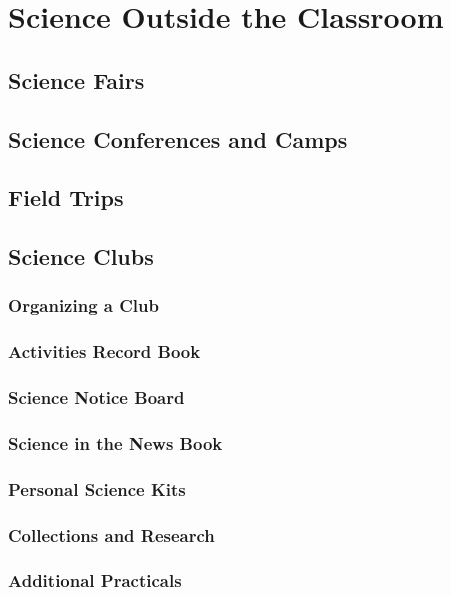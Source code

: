 \chapter{Science Outside the Classroom}


\section{Science Fairs}


\section{Science Conferences and Camps}


\section{Field Trips}


\section{Science Clubs}


\subsection{Organizing a Club}

\subsection{Activities Record Book}

\subsection{Science Notice Board}

\subsection{Science in the News Book}

\subsection{Personal Science Kits}

\subsection{Collections and Research}

\subsection{Additional Practicals}